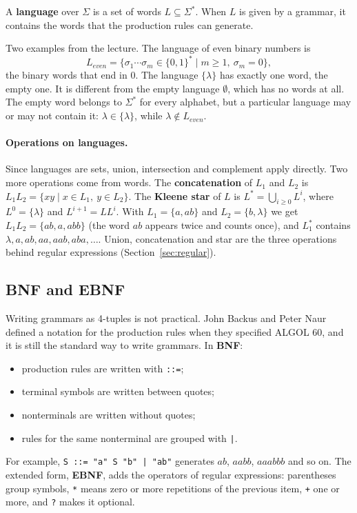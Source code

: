 \begin{definition}
A \textbf{language} over $\Sigma$ is a set of words $L \subseteq \Sigma^*$. When
$L$ is given by a grammar, it contains the words that the production rules
can generate.
\end{definition}

Two examples from the lecture. The language of even binary numbers is
\[
  L_{\mathit{even}} = \{ \sigma_1 \cdots \sigma_m \in \{0,1\}^* \mid m \ge 1,\ \sigma_m = 0 \},
\]
the binary words that end in 0. The language $\{\lambda\}$ has exactly one
word, the empty one. It is different from the empty language $\emptyset$,
which has no words at all. The empty word belongs to $\Sigma^*$ for every
alphabet, but a particular language may or may not contain it: $\lambda \in
\{\lambda\}$, while $\lambda \notin L_{\mathit{even}}$.

\paragraph{Operations on languages.} Since languages are sets, union,
intersection and complement apply directly. Two more operations come from
words. The \textbf{concatenation} of $L_1$ and $L_2$ is
$L_1 L_2 = \{ xy \mid x \in L_1,\ y \in L_2 \}$. The \textbf{Kleene star} of
$L$ is $L^* = \bigcup_{i \ge 0} L^i$, where $L^0 = \{\lambda\}$ and
$L^{i+1} = L L^i$. With $L_1 = \{a, ab\}$ and $L_2 = \{b, \lambda\}$ we get
$L_1 L_2 = \{ab, a, abb\}$ (the word $ab$ appears twice and counts once), and
$L_1^*$ contains $\lambda, a, ab, aa, aab, aba, \dots$. Union, concatenation
and star are the three operations behind regular expressions
(Section~\ref{sec:regular}).

\subsection{BNF and EBNF}

Writing grammars as 4-tuples is not practical. John Backus and Peter Naur
defined a notation for the production rules when they specified ALGOL 60, and
it is still the standard way to write grammars. In \textbf{BNF}:
\begin{itemize}
  \item production rules are written with \texttt{::=};
  \item terminal symbols are written between quotes;
  \item nonterminals are written without quotes;
  \item rules for the same nonterminal are grouped with \texttt{|}.
\end{itemize}
For example, \lstinline{S ::= "a" S "b" | "ab"} generates $ab$, $aabb$,
$aaabbb$ and so on. The extended form, \textbf{EBNF}, adds the operators of
regular expressions: parentheses group symbols, \texttt{*} means zero or more
repetitions of the previous item, \texttt{+} one or more, and \texttt{?} makes
it optional.

